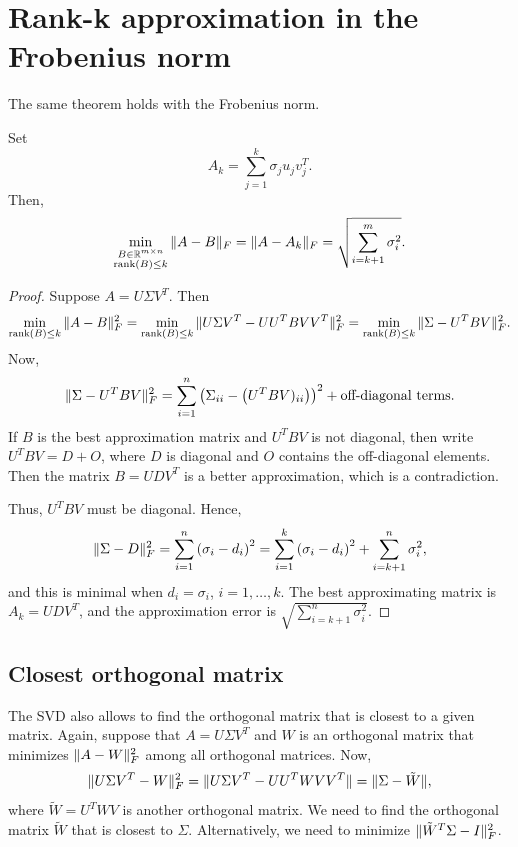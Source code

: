 \documentclass{article}
\begin{document}
\section{Rank-k approximation in the Frobenius norm}

The same theorem holds with the Frobenius norm.
\begin{theorem} Set
\begin{equation*}
A_{k} = \sum_{j=1}^{k} \sigma_{j} u_{j} v_{j}^{T}.
\end{equation*}
Then,
\begin{equation*}
\min_{\substack{B \in \mathbb{R}^{m \times n} \\
\operatorname{rank}(B) \leq k}} \| A-B \|_{F} = \| A-A_{k} \|_{F}
= \sqrt{\sum_{i=k+1}^{m} \sigma_{i}^{2}}.
\end{equation*}
\end{theorem}
\begin{proof}
Suppose $A=U \Sigma V^{T}$. Then
\begin{equation*}
\min_{\operatorname{rank}(B) \leq k} \| A-B \|^{2}_{F} =
\min_{\operatorname{rank}(B) \leq k} \| U \Sigma V^{T} - UU^{T} B
VV^{T} \|^{2}_{F} = \min_{\operatorname{rank}(B) \leq k} \| \Sigma
- U^{T} B V \|^{2}_{F}.
\end{equation*}
Now,
\begin{equation*}
\| \Sigma - U^{T} B V \|^{2}_{F} = \sum_{i=1}^{n} \left (
\Sigma_{ii} - \left (U^{T}B V)_{ii} \right ) \right )^{2} +
\text{off-diagonal terms}.
\end{equation*}
If $B$ is the best approximation matrix and $U^{T}B V$ is not
diagonal, then write $U^{T}B V=D+O$, where $D$ is diagonal and $O$
contains the off-diagonal elements. Then the matrix $B = U D V^{T}$
is a better approximation, which is a contradiction.

Thus, $U^{T}B V$ must be diagonal. Hence,
\begin{equation*}
\| \Sigma - D \|^{2}_{F} = \sum_{i=1}^{n} \left (\sigma_{i} - d_{i}
\right )^{2} = \sum_{i=1}^{k} \left (\sigma_{i} - d_{i} \right )^{2}
+ \sum_{i=k+1}^{n} \sigma_{i}^{2},
\end{equation*}
and this is minimal when $d_{i}=\sigma_{i}$, $i=1,\ldots,k$. The
best approximating matrix is $A_{k} = U D V^{T}$, and the
approximation error is $\sqrt{\sum_{i=k+1}^{n} \sigma_{i}^{2}}$.
\end{proof}


\subsection{Closest orthogonal matrix}
The SVD also allows to find the orthogonal matrix that is closest to
a given matrix. Again, suppose that $A = U \Sigma V^{T}$ and $W$ is
an orthogonal matrix that minimizes $\| A-W \|^{2}_{F}$ among all
orthogonal matrices. Now,
\begin{equation*}
\| U \Sigma V^{T} - W \|_{F}^{2} = \| U \Sigma V^{T} - UU^{T} W
VV^{T} \| = \| \Sigma - \tilde{W} \|,
\end{equation*}
where $\tilde{W}=U^{T} W V$ is another orthogonal matrix. We need to
find the orthogonal matrix $\tilde{W}$ that is closest to $\Sigma$.
Alternatively, we need to minimize $\| \tilde{W}^{T} \Sigma -
I \|_{F}^{2}$.
\end{document}
